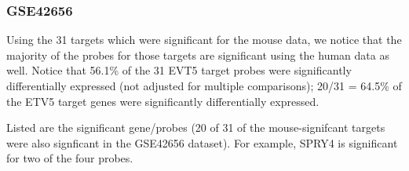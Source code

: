 \documentclass{article}\usepackage[]{graphicx}\usepackage[]{color}
\begin{document}
\subsubsection{GSE42656}

Using the 31 targets which were significant for the mouse data, we notice that the majority of the probes for those targets are significant using the human data as well.  Notice that 56.1\% of the 31 EVT5 target probes were significantly differentially expressed (not adjusted for multiple comparisons); 20/31 = 64.5\% of the ETV5 target genes were significantly differentially expressed.


Listed are the significant gene/probes (20 of 31 of the mouse-signifcant targets were also signficant in the GSE42656 dataset).  For example, SPRY4 is significant for two of the four probes.
\end{document}
